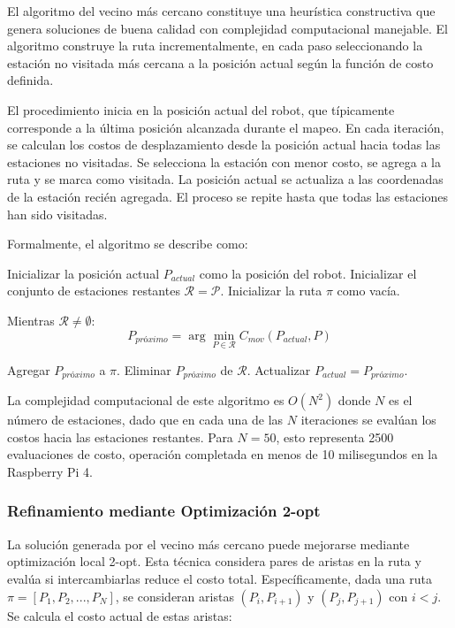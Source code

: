 El algoritmo del vecino más cercano constituye una heurística constructiva que genera soluciones de buena calidad con complejidad computacional manejable. El algoritmo construye la ruta incrementalmente, en cada paso seleccionando la estación no visitada más cercana a la posición actual según la función de costo definida.

El procedimiento inicia en la posición actual del robot, que típicamente corresponde a la última posición alcanzada durante el mapeo. En cada iteración, se calculan los costos de desplazamiento desde la posición actual hacia todas las estaciones no visitadas. Se selecciona la estación con menor costo, se agrega a la ruta y se marca como visitada. La posición actual se actualiza a las coordenadas de la estación recién agregada. El proceso se repite hasta que todas las estaciones han sido visitadas.

Formalmente, el algoritmo se describe como:

Inicializar la posición actual $P_{actual}$ como la posición del robot.
Inicializar el conjunto de estaciones restantes $\mathcal{R} = \mathcal{P}$.
Inicializar la ruta $\pi$ como vacía.

Mientras $\mathcal{R} \neq \emptyset$:
\begin{equation}
P_{próximo} = \arg\min_{P \in \mathcal{R}} C_{mov}(P_{actual}, P)
\end{equation}

Agregar $P_{próximo}$ a $\pi$.
Eliminar $P_{próximo}$ de $\mathcal{R}$.
Actualizar $P_{actual} = P_{próximo}$.

La complejidad computacional de este algoritmo es $O(N^2)$ donde $N$ es el número de estaciones, dado que en cada una de las $N$ iteraciones se evalúan los costos hacia las estaciones restantes. Para $N = 50$, esto representa 2500 evaluaciones de costo, operación completada en menos de 10 milisegundos en la Raspberry Pi 4.

\subsubsection{Refinamiento mediante Optimización 2-opt}

La solución generada por el vecino más cercano puede mejorarse mediante optimización local 2-opt. Esta técnica considera pares de aristas en la ruta y evalúa si intercambiarlas reduce el costo total. Específicamente, dada una ruta $\pi = [P_1, P_2, ..., P_N]$, se consideran aristas $(P_i, P_{i+1})$ y $(P_j, P_{j+1})$ con $i < j$. Se calcula el costo actual de estas aristas:

